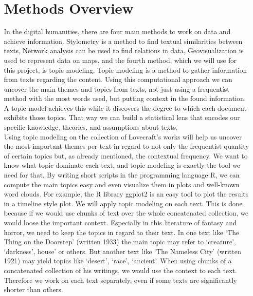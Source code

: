 \section{Methods Overview}

In the digital humanities, there are four main methods to work on data and achieve 
information. Stylometry is a method to find textual similarities between texts, Network 
analysis can be used to find relations in data, Geovisualization is used to represent 
data on maps, and the fourth method, which we will use for this project, is topic modeling. 
Topic modeling is a method to gather information from texts regarding the content. Using 
this computational approach we can uncover the main themes and topics from texts, not 
just using a frequentist method with the most words used, but putting context in the 
found information. A topic model achieves this while it discovers the degree to which 
each document exhibits those topics. That way we can build a statistical lens that 
encodes our specific knowledge, theories, and assumptions about texts.\\

Using topic modeling on the collection of Lovecraft’s works will help us uncover the 
most important themes per text in regard to not only the frequentist quantity of certain 
topics but, as already mentioned, the contextual frequency. We want to know what topic 
dominate each text, and topic modeling is exactly the tool we need for that. By writing 
short scripts in the programming language R, we can compute the main topics easy and even 
visualize them in plots and well-known word clouds. For example, the R library ggplot2 
is an easy tool to plot the results in a timeline style plot.
We will apply topic modeling on each text. This is done because if we would use chunks of 
text over the whole concatenated collection, we would loose the important context. 
Especially in this literature of fantasy and horror, we need to keep the topics in regard 
to their text. In one text like ‘The Thing on the Doorstep’ (written 1933) the main topic 
may refer to ‘creature’, ‘darkness’, house’ or others. But another text like ‘The Nameless 
City’ (written 1921) may yield topics like ‘desert’, ‘race’, ‘ancient’. When using chunks 
of a concatenated collection of his writings, we would use the context to each text. 
Therefore we work on each text separately, even if some texts are significantly shorter 
than others.\\

